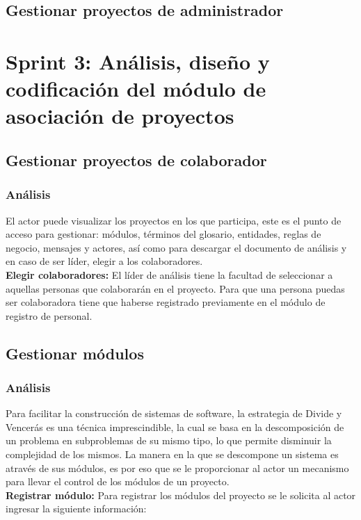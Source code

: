 \subsection{Gestionar proyectos de administrador}


\section{Sprint 3: Análisis, diseño y codificación del módulo de asociación de proyectos}
\subsection{Gestionar proyectos de colaborador}
\subsubsection {Análisis}
El actor puede visualizar los proyectos en los que participa, este es el punto de acceso para gestionar: módulos, términos del glosario, entidades, reglas de negocio, mensajes y actores, así como para descargar el documento de análisis y en caso de ser líder, elegir a los colaboradores.\\

\textbf {Elegir colaboradores:} El líder de análisis tiene la facultad de seleccionar a aquellas personas que colaborarán en el proyecto. Para que una persona puedas ser colaboradora tiene que haberse registrado previamente en el módulo de registro de personal.

\subsection{Gestionar módulos}

\subsubsection {Análisis}
Para facilitar la construcción de sistemas de software, la estrategia de Divide y Vencerás es una técnica imprescindible, la cual se basa en la descomposición de un problema en subproblemas de su mismo tipo, lo que permite disminuir la complejidad de los mismos. La manera en la que se descompone un sistema es através de sus módulos, es por eso que se le proporcionar al actor un mecanismo para llevar el control de los módulos de un proyecto. \\

\textbf {Registrar módulo:}
Para registrar los módulos del proyecto se le solicita al actor ingresar la siguiente información:

